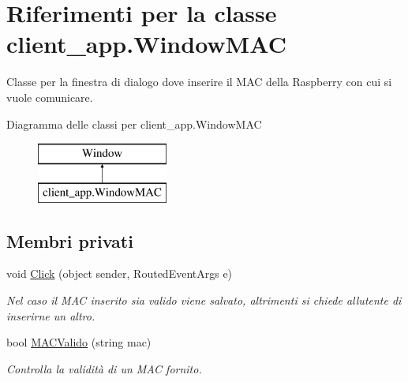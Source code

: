 \hypertarget{classclient__app_1_1_window_m_a_c}{}\section{Riferimenti per la classe client\+\_\+app.\+Window\+M\+AC}
\label{classclient__app_1_1_window_m_a_c}


Classe per la finestra di dialogo dove inserire il M\+AC della Raspberry con cui si vuole comunicare.  


Diagramma delle classi per client\+\_\+app.\+Window\+M\+AC\begin{figure}[H]
\begin{center}
\leavevmode
\includegraphics[height=2.000000cm]{classclient__app_1_1_window_m_a_c}
\end{center}
\end{figure}
\subsection*{Membri privati}
\begin{DoxyCompactItemize}
\item 
\mbox{\label{classclient__app_1_1_window_m_a_c_a3f453ef37594247107e8944807a33242}} 
void \mbox{\hyperlink{classclient__app_1_1_window_m_a_c_a3f453ef37594247107e8944807a33242}{Click}} (object sender, Routed\+Event\+Args e)
\begin{DoxyCompactList}\small\item\em Nel caso il M\+AC inserito sia valido viene salvato, altrimenti si chiede all\textquotesingle{}utente di inserirne un altro. \end{DoxyCompactList}\item 
bool \mbox{\hyperlink{classclient__app_1_1_window_m_a_c_aae7242aa53e9b5d8155ae1b567ee3665}{M\+A\+C\+Valido}} (string mac)
\begin{DoxyCompactList}\small\item\em Controlla la validità di un M\+AC fornito. \end{DoxyCompactList}\end{DoxyCompactItemize}
